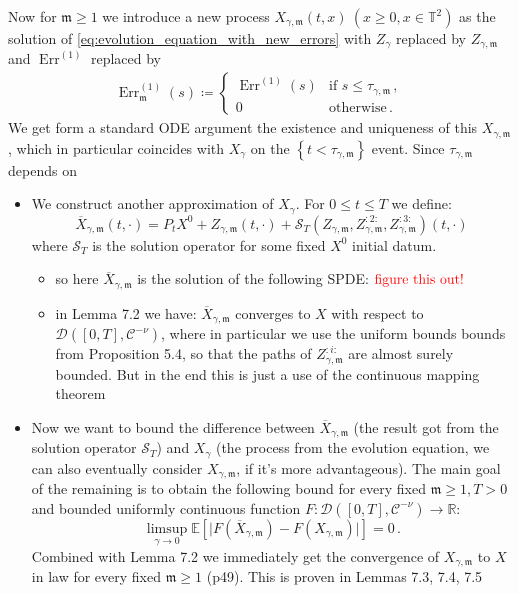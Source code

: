 \documentclass{report}
\newcommand{\TT}{\mathbb{T}}
\DeclareMathOperator{\DefiningEquality}{\coloneqq}
\theoremstyle{remark}
\theoremstyle{definition}
\begin{document}
Now for $\mathfrak{m} \ge 1$ we introduce a new process $X_{\gamma, \mathfrak{m}}(t, x)~(x \ge 0, x \in \TT^2)$ as the solution of \eqref{eq:evolution_equation_with_new_errors} with $Z_\gamma$ replaced by $Z_{\gamma, \mathfrak{m}}$ and $\operatorname{Err}^{(1)}$ replaced by
\begin{align*}
  \operatorname{Err}^{(1)}_\mathfrak{m}(s) \DefiningEquality \begin{cases}
    \operatorname{Err}^{(1)}(s)&\text{if }s \le \tau_{\gamma,\mathfrak{m}}\,,\\
    0&\text{otherwise}\,.
  \end{cases} 
\end{align*}
We get form a standard ODE argument the existence and uniqueness of this $X_{\gamma, \mathfrak{m}}$ \cite{mourrat2015convergencetwodimensionaldynamicisingkac}, which in particular coincides with $X_\gamma$ on the $\left\{t < \tau_{\gamma, \mathfrak{m}}\right\}$ event. Since $\tau_{\gamma,\mathfrak{m}}$ depends on 

\begin{itemize}
  \item We construct another approximation of $X_\gamma$. For $0 \le t \le T$ we define:$$\overline{X}_{\gamma, \mathfrak{m}}(t, \cdot) = P_t X^0 + Z_{\gamma, \mathfrak{m}}(t, \cdot) + \mathcal{S}_T(Z_{\gamma, \mathfrak{m}}, Z^{:2:}_{\gamma, \mathfrak{m}}, Z_{\gamma, \mathfrak{m}}^{:3:})(t, \cdot)$$where $\mathcal{S}_T$ is the solution operator for some fixed $X^0$ initial datum. 
  \begin{itemize}
    \item so here $\overline{X}_{\gamma, \mathfrak{m}}$ is the solution of the following SPDE: $\textcolor{red}{\text{figure this out!}}$ 
    \item in Lemma 7.2 we have: $\overline{X}_{\gamma, \mathfrak{m}}$ converges to $X$ with respect to $\mathcal{D}([0, T], \mathcal{C}^{-\nu})$, where in particular we use the uniform bounds bounds from Proposition 5.4, so that the paths of $Z_{\gamma, \mathfrak{m}}^{:i:}$ are almost surely bounded. But in the end this is just a use of the continuous mapping theorem
  \end{itemize}
  \item Now we want to bound the difference between $\overline{X}_{\gamma, \mathfrak{m}}$ (the result got from the solution operator $\mathcal{S}_T$) and $X_\gamma$ (the process from the evolution equation, we can also eventually consider $X_{\gamma, \mathfrak{m}}$, if it's more advantageous). The main goal of the remaining is to obtain the following bound for every fixed $\mathfrak{m} \ge 1, T > 0$ and bounded uniformly continuous function $F: \mathcal{D}([0, T], \mathcal{C}^{-\nu}) \to \mathbb{R}$: $$\limsup_{\gamma \to 0} \mathbb{E}\left[\lvert F(\overline{X}_{\gamma, \mathfrak{m}}) - F({X}_{\gamma, \mathfrak{m}})\rvert\right] = 0\,.$$Combined with Lemma 7.2 we immediately get the convergence of ${X}_{\gamma, \mathfrak{m}}$ to $X$ in law for every fixed $\mathfrak{m} \ge 1$ (p49). This is proven in Lemmas 7.3, 7.4, 7.5
\end{itemize}
\end{document}
